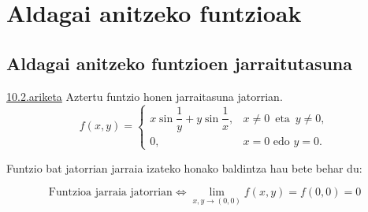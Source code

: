 \chapter{Aldagai anitzeko funtzioak}
\section{Aldagai anitzeko funtzioen jarraitutasuna}
\underline{10.2.ariketa} Aztertu funtzio honen jarraitasuna jatorrian.
$$f(x,y) = \left\{ \begin{array}{cl}
		x\sin \dfrac{1}{y} +y \sin \dfrac{1}{x},  &  x \neq 0 \, \mbox{ eta } \, y \neq 0, \\
                 0,	                                &  x=0 \mbox{ edo } y=0.
		   \end{array} \right. $$
		   
		 
Funtzio bat jatorrian jarraia izateko honako baldintza hau bete behar du:

\begin{equation*}
    \text{Funtzioa jarraia jatorrian}
    \Longleftrightarrow
    \boxed{\lim_{x,y \to (0,0)}f(x,y)=f(0,0)=0}
\end{equation*}
	   
